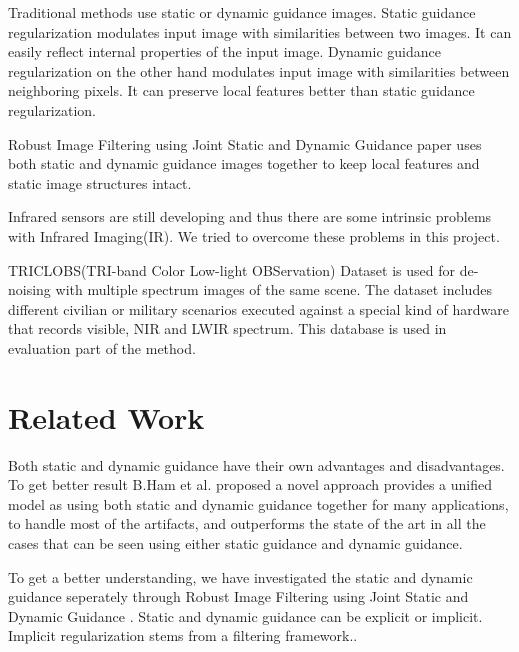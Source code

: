 \documentclass[10pt,twocolumn,letterpaper]{article}
\begin{document}
Traditional methods use static or dynamic guidance images. Static guidance regularization modulates input image with similarities between two images. It can easily reflect internal properties of the input image.
Dynamic guidance regularization on the other hand modulates input image with similarities between neighboring pixels. It can preserve local features better than static guidance regularization.

Robust Image Filtering using Joint Static and Dynamic Guidance\cite{ham2015robust} paper uses both static and dynamic guidance images together to keep local features and static image structures intact.

Infrared sensors are still developing and thus there are some intrinsic problems with Infrared Imaging(IR). We tried to overcome these problems in this project.

TRICLOBS(TRI-band Color Low-light OBServation) Dataset\cite{triclobs} is used for de-noising with multiple spectrum images of the same scene. The dataset includes different civilian or military scenarios executed against a special kind of hardware that records visible, NIR and LWIR spectrum. This database is used in evaluation part of the method\cite{ham2015robust}.

\section{Related Work}

Both static and dynamic guidance have their own advantages and disadvantages. To get better result B.Ham et al.\cite{ham2015robust} proposed a novel approach provides a unified model as using both static and dynamic guidance together for many applications, to handle most of the artifacts, and outperforms the state of the art in all the cases that can be seen using either static guidance and dynamic guidance.

To get a better understanding, we have investigated the static and dynamic guidance seperately through Robust Image Filtering using Joint Static and Dynamic
Guidance\cite{ham2015robust} . Static and dynamic guidance can be explicit or implicit. Implicit regularization stems from a filtering framework.\cite{ham2015robust}. 
\end{document}
